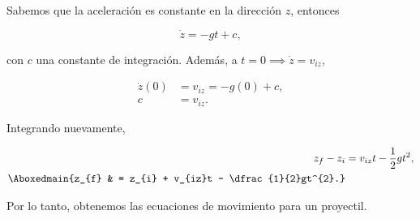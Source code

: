 \documentclass[../main.tex]{subfiles}
\begin{document}
\begin{problema}
	Sabemos que la aceleración es constante en la dirección \(z\), entonces

	\begin{equation*}
		\dot{z} = -gt + c,
	\end{equation*}

	con \(c\) una constante de integración. Además, a \(t = 0 \implies \dot{z} = v_{iz}\),

	\begin{align}
		\dot{z}(0) & = v_{iz} = -g(0) + c, \\
		c          & = v_{iz}.
	\end{align}

	Integrando nuevamente,

	\begin{align*}
		z_{f} - z_{i}     & = v_{iz}t - \dfrac{1}{2}gt^{2},          \\
		\Aboxedmain{z_{f} & = z_{i} + v_{iz}t - \dfrac{1}{2}gt^{2}.}
	\end{align*}

	Por lo tanto, obtenemos las ecuaciones de movimiento para un proyectil.
\end{problema}
\end{document}
